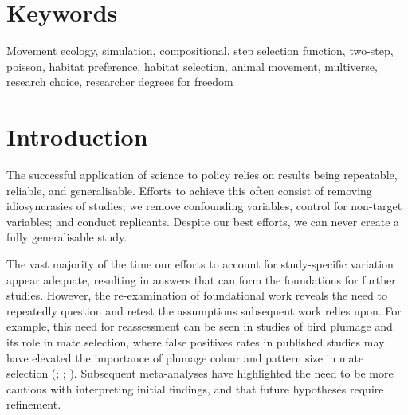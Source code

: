 \documentclass[10pt,a4paper]{article}
\begin{document}
\section*{Keywords}

Movement ecology, simulation, compositional, step selection function, two-step, poisson, habitat preference, habitat selection, animal movement, multiverse, research choice, researcher degrees for freedom

\clearpage
\pagestyle{fancy}

\section{Introduction}\label{introduction}

The successful application of science to policy relies on results being repeatable, reliable, and generalisable.
Efforts to achieve this often consist of removing idiosyncrasies of studies; we remove confounding variables, control for non-target variables; and conduct replicants.
Despite our best efforts, we can never create a fully generalisable study.

The vast majority of the time our efforts to account for study-specific variation appear adequate, resulting in answers that can form the foundations for further studies.
However, the re-examination of foundational work reveals the need to repeatedly question and retest the assumptions subsequent work relies upon.
For example, this need for reassessment can be seen in studies of bird plumage and its role in mate selection, where false positives rates in published studies may have elevated the importance of plumage colour and pattern size in mate selection (; ; ).
Subsequent meta-analyses have highlighted the need to be more cautious with interpreting initial findings, and that future hypotheses require refinement.
\end{document}
